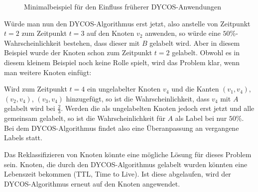 \begin{figure}[ht]
    \centering
    \subfloat[$t=1$]{
        
        \label{fig:graph-t1}
    }%
    \subfloat[$t=2$]{
        
        \label{fig:graph-t2}
    }

    \subfloat[$t=3$]{
        
        \label{fig:graph-t3}
    }%
    \subfloat[$t=4$]{
        
        \label{fig:graph-t4}
    }%
    \label{Formen}
    \caption{Minimalbeispiel für den Einfluss früherer DYCOS-Anwendungen}
\end{figure}

Würde man nun den DYCOS-Algorithmus erst jetzt, also anstelle von
Zeitpunkt $t=2$ zum Zeitpunkt $t=3$ auf den Knoten $v_2$ anwenden, so
würde eine $50\%$-Wahrscheinlichkeit bestehen, dass dieser mit $B$ 
gelabelt wird. Aber in diesem Beispiel wurde der Knoten schon
zum Zeitpunkt $t=2$ gelabelt. Obwohl es in diesem kleinem Beispiel
noch keine Rolle spielt, wird das Problem klar, wenn man weitere
Knoten einfügt:

Wird zum Zeitpunkt $t=4$ ein ungelabelter Knoten $v_4$ und die Kanten
$(v_1, v_4)$, $(v_2, v_4)$, $(v_3, v_4)$ hinzugefügt, so ist die 
Wahrscheinlichkeit, dass $v_4$ mit $A$ gelabelt wird bei $\frac{2}{3}$.
Werden die als ungelabelten Knoten jedoch erst jetzt und alle gemeinsam
gelabelt, so ist die Wahrscheinlichkeit für $A$ als Label bei nur $50\%$.
Bei dem DYCOS-Algorithmus findet also eine Überanpassung an vergangene
Labels statt.

Das Reklassifizieren von Knoten könnte eine mögliche Lösung für dieses
Problem sein. Knoten, die durch den DYCOS-Algorithmus gelabelt wurden
könnten eine Lebenszeit bekommen (TTL, Time to Live). Ist diese 
abgelaufen, wird der DYCOS-Algorithmus erneut auf den Knoten angewendet.

